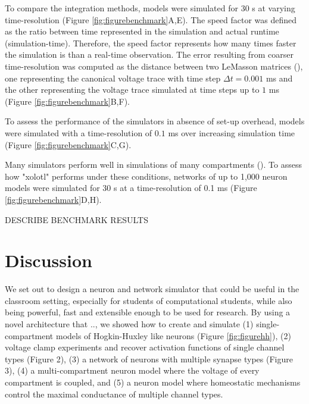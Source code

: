 \documentclass{frontiersSCNS} %
\begin{document}
To compare the integration methods, models were simulated for 30 s at varying time-resolution (Figure \ref{fig:figurebenchmark}A,E). The speed factor was defined as the ratio between time represented in the simulation and actual runtime (simulation-time). Therefore, the speed factor represents how many times faster the simulation is than a real-time observation. The error resulting from coarser time-resolution was computed as the distance between two LeMasson matrices (\cite{lemassonIntroductionEquationSolving2000}), one representing the canonical voltage trace with time step $\Delta t = 0.001$ ms and the other representing the voltage trace simulated at time steps up to $1$ ms (Figure \ref{fig:figurebenchmark}B,F).

To assess the performance of the simulators in absence of set-up overhead, models were simulated with a time-resolution of $0.1$ ms over increasing simulation time (Figure \ref{fig:figurebenchmark}C,G).

Many simulators perform well in simulations of many compartments (\cite{bretteSimulationNetworksSpiking2007, sherfeyDynaSimMATLABToolbox2018, vitayANNarchyCodeGeneration2015, delormeSpikeNETEventdrivenSimulation2003}). To assess how "xolotl" performs under these conditions, networks of up to 1,000 neuron models were simulated for 30 s at a time-resolution of 0.1 ms (Figure \ref{fig:figurebenchmark}D,H).

DESCRIBE BENCHMARK RESULTS

%
%
%
%
%
%

\section{Discussion}
\label{discussion}

We set out to design a neuron and network simulator that could be useful in the classroom setting, especially for students of computational students, while also being powerful, fast and extensible enough to be used for research. By using a novel architecture that .., we showed how to create and simulate (1) single-compartment models of Hogkin-Huxley like neurons (Figure \ref{fig:figurehh}), (2) voltage clamp experiments and recover activation functions of single channel types (Figure 2), (3) a network of neurons with multiple synapse types (Figure 3), (4) a multi-compartment neuron model where the voltage of every compartment is coupled, and (5) a neuron model where homeostatic mechanisms control the maximal conductance of multiple channel types. 
\end{document}
